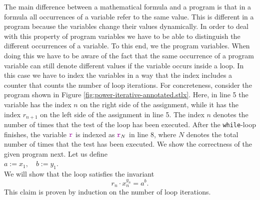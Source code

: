 The main difference between a mathematical formula and a program is that in a formula all
occurrences of a variable refer to the same value.   This is different in a program because the
variables change their values dynamically.  In order to deal with this property of program variables
we have to be able to distinguish the different occurrences of a variable.  To this end,  we 
 the program variables. 
When doing this we have to be aware of the fact that the same occurrence of a program variable can
still denote different values if the variable occurs inside  a loop.  In this case we have to index
the variables in a way that the index includes a counter that counts the number of loop iterations.
For concreteness, consider the  program shown in 
Figure \ref{fig:power-iterative-annotated.stlx}.  
Here, in line 5 the variable  has the index $n$ on the right side of the assignment,
while it has the index $r_{n+1}$ on the left side of the assignment in line 5.  The index $n$ denotes 
the number of times that the test  of the  loop has been executed.
After the \texttt{while}-loop finishes, the variable $\mytt{r}$ is indexed as
$\mytt{r}_N$ in line 8, where $N$ denotes the total number of times that the test  has been executed.
We show the correctness of the given program next.  Let us define
\\[0.2cm]
\hspace*{1.3cm}
$ a := x_1, \quad b := y_1$.
\\[0.2cm]
We will show that the  loop satisfies the invariant
\begin{equation}
  \label{eq:powerInv}
   r_n \cdot x_n^{y_n} = a^b.
\end{equation}
This claim is proven by induction on the number of loop iterations.
